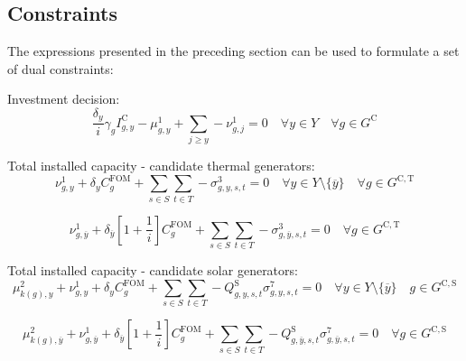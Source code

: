 \documentclass{article}
\newcommand{\sGeneratorsCandidate}{G^{\mathrm{C}}}
\newcommand{\sGeneratorsCandidateThermal}{G^{\mathrm{C,T}}}
\newcommand{\sGeneratorsCandidateSolar}{G^{\mathrm{C,S}}}
\newcommand{\sYears}{Y}
\newcommand{\sScenarios}{S}
\newcommand{\sIntervals}{T}
\newcommand{\iGenerator}{g}
\newcommand{\iYear}{y}
\newcommand{\iYearTerminal}{\overline{\iYear}}
\newcommand{\iYearAlias}{j}
\newcommand{\iScenario}{s}
\newcommand{\iInterval}{t}
\newcommand{\iZone}{z}
\newcommand{\cFixedOperationsMaintenanceCostGenerator}[1][\iGenerator]{C^{\mathrm{FOM}}_{#1}}
\newcommand{\cAmortisationRate}[1][\iGenerator]{\gamma_{#1}}
\newcommand{\cCandidateInvestmentCost}[1][\iGenerator,\iYear]{I^{\mathrm{C}}_{#1}}
\newcommand{\cInterestRate}{i}
\newcommand{\cCapacityFactorSolar}[1][\iGenerator,\iYear,\iScenario,\iInterval]{Q_{#1}^{\mathrm{S}}}
\newcommand{\cDiscountRate}[1][\iYear]{\delta_{#1}}
\newcommand{\dNonNegativeCandidateCapacity}[1][\iGenerator,\iYear]{\mu_{#1}^{1}}
\newcommand{\dSolarBuildLimit}[1][\iZone,\iYear]{\mu_{#1}^{2}}
\newcommand{\dTotalInstallCapacity}[1][\iGenerator,\iYear]{\nu_{#1}^{1}}
\newcommand{\dMaxPowerOutputCandidateThermal}[1][\iGenerator,\iYear,\iScenario,\iInterval]{\sigma_{#1}^{3}}
\newcommand{\dMaxPowerOutputSolarCandidate}[1][\iGenerator,\iYear,\iScenario,\iInterval]{\sigma_{#1}^{7}}
\begin{document}
\subsection{Constraints}
The expressions presented in the preceding section can be used to formulate a set of dual constraints:

Investment decision:
\begin{equation}
\frac{\cDiscountRate}{\cInterestRate} \cAmortisationRate \cCandidateInvestmentCost - \dNonNegativeCandidateCapacity + \sum\limits_{\iYearAlias \geq \iYear} -\dTotalInstallCapacity[\iGenerator,\iYearAlias] = 0 \quad \forall \iYear \in \sYears \quad \forall \iGenerator \in \sGeneratorsCandidate
\end{equation}

Total installed capacity - candidate thermal generators:
\begin{equation}
 \dTotalInstallCapacity + \cDiscountRate \cFixedOperationsMaintenanceCostGenerator + \sum\limits_{\iScenario \in \sScenarios}\sum\limits_{\iInterval \in \sIntervals} - \dMaxPowerOutputCandidateThermal = 0 \quad \forall \iYear \in \sYears \setminus \{\iYearTerminal\} \quad \forall \iGenerator \in \sGeneratorsCandidateThermal
\end{equation}

\begin{equation}
\dTotalInstallCapacity[\iGenerator,\iYearTerminal] + \cDiscountRate[\iYearTerminal] \left[1 + \frac{1}{\cInterestRate}\right] \cFixedOperationsMaintenanceCostGenerator + \sum\limits_{\iScenario \in \sScenarios}\sum\limits_{\iInterval \in \sIntervals} - \dMaxPowerOutputCandidateThermal[\iGenerator,\iYearTerminal,\iScenario,\iInterval] = 0 \quad \forall \iGenerator \in \sGeneratorsCandidateThermal
\end{equation}


Total installed capacity - candidate solar generators:
\begin{equation}
\dSolarBuildLimit[k(\iGenerator), \iYear] + \dTotalInstallCapacity + \cDiscountRate \cFixedOperationsMaintenanceCostGenerator + \sum\limits_{\iScenario \in \sScenarios}\sum\limits_{\iInterval \in \sIntervals} - \cCapacityFactorSolar \dMaxPowerOutputSolarCandidate = 0 \quad \forall \iYear \in \sYears \setminus \{\iYearTerminal\} \quad \iGenerator \in \sGeneratorsCandidateSolar
\end{equation}

\begin{equation}
\dSolarBuildLimit[k(\iGenerator),\iYearTerminal] + \dTotalInstallCapacity[\iGenerator,\iYearTerminal] + \cDiscountRate[\iYearTerminal] \left[1 + \frac{1}{\cInterestRate}\right] \cFixedOperationsMaintenanceCostGenerator + \sum\limits_{\iScenario \in \sScenarios}\sum\limits_{\iInterval \in \sIntervals} - \cCapacityFactorSolar[\iGenerator,\iYearTerminal,\iScenario,\iInterval] \dMaxPowerOutputSolarCandidate[\iGenerator,\iYearTerminal,\iScenario,\iInterval] = 0 \quad \forall \iGenerator \in \sGeneratorsCandidateSolar
\end{equation}
\end{document}
